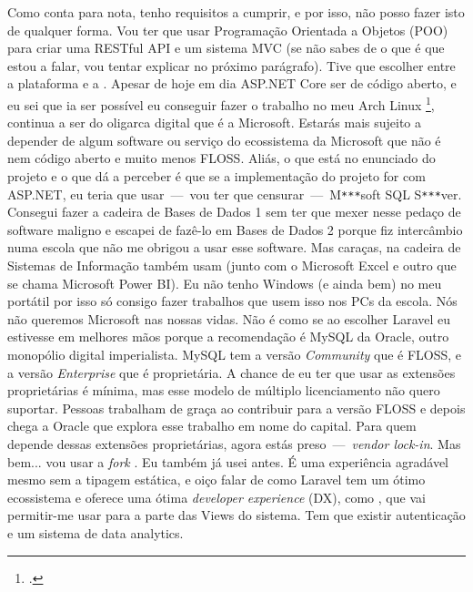 \documentclass[12pt,a4paper,openright,oneside]{memoir}
\begin{document}
Como conta para nota, tenho requisitos a cumprir, e por isso, não posso fazer
isto de qualquer forma. Vou ter que usar Programação Orientada a Objetos (POO)
para criar uma RESTful API e um sistema MVC (se não sabes de o que é que estou
a falar, vou tentar explicar no próximo parágrafo). Tive que escolher entre a
plataforma \autocite{laravel} e a \autocite{aspnet_core}. Apesar de hoje em dia
ASP.NET Core ser de código aberto, e eu sei que ia ser possível eu conseguir
fazer o trabalho no meu Arch Linux \footcite{tsoding}, continua a ser do
oligarca digital que é a Microsoft. Estarás mais sujeito a depender de algum
software ou serviço do ecossistema da Microsoft que não é nem código aberto e
muito menos FLOSS. Aliás, o que está no enunciado do projeto e o que dá a
perceber é que se a implementação do projeto for com ASP.NET, eu teria que
usar\mbox{ --- }vou ter que censurar\mbox{ --- }M\texttt{***}soft SQL
S\texttt{***}ver. Consegui fazer a cadeira de Bases de Dados 1 sem ter que
mexer nesse pedaço de software maligno e escapei de fazê-lo em Bases de Dados 2
porque fiz intercâmbio numa escola que não me obrigou a usar esse software. Mas
caraças, na cadeira de Sistemas de Informação também usam (junto com o
Microsoft Excel e outro que se chama Microsoft Power BI). Eu não tenho Windows
(e ainda bem) no meu portátil por isso só consigo fazer trabalhos que usem isso
nos PCs da escola. Nós não queremos Microsoft nas nossas vidas. Não é como se
ao escolher Laravel eu estivesse em melhores mãos porque a recomendação é MySQL
da Oracle, outro monopólio digital imperialista. MySQL tem a versão
\textit{Community} que é FLOSS, e a versão \textit{Enterprise} que é
proprietária. A chance de eu ter que usar as extensões proprietárias é mínima,
mas esse modelo de múltiplo licenciamento não quero suportar. Pessoas trabalham
de graça ao contribuir para a versão FLOSS e depois chega a Oracle que explora
esse trabalho em nome do capital. Para quem depende dessas extensões
proprietárias, agora estás preso\mbox{ --- }\textit{vendor lock-in}. Mas bem...
vou usar a \textit{fork} \autocite{mariadb_foundation}. Eu também já usei
\autocite{php} antes. É uma experiência agradável mesmo sem a tipagem estática,
e oiço falar de como Laravel tem um ótimo ecossistema e oferece uma ótima
\textit{developer experience} (DX), como \autocite{inertiajs}, que vai
permitir-me usar \autocite{svelte} para a parte das Views do sistema. Tem que
existir autenticação e um sistema de data analytics.
\end{document}
